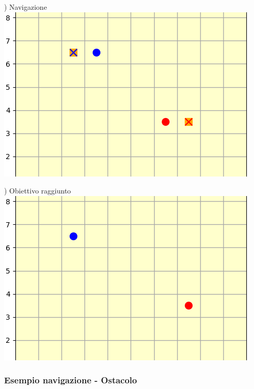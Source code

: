 \documentclass[12pt]{article}
\begin{document}
\noindent \begin{minipage}[ht]{0.45\linewidth}
) Navigazione
\includegraphics[width=\textwidth]{SimulazioniNavigazione/2AGV_NoConflitti/4.png}
\end{minipage}
\begin{minipage}[ht]{0.45\linewidth}
) Obiettivo raggiunto
\includegraphics[width=\textwidth]{SimulazioniNavigazione/2AGV_NoConflitti/5.png}
\end{minipage}

\newpage

\subsubsection{Esempio navigazione - Ostacolo}
\vspace{0.2cm}
\end{document}
